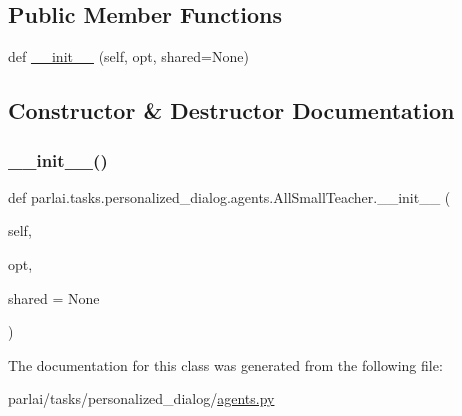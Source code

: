 \subsection*{Public Member Functions}
\begin{DoxyCompactItemize}
\item 
def \hyperlink{classparlai_1_1tasks_1_1personalized__dialog_1_1agents_1_1AllSmallTeacher_a1bb0f39431c43a72a244ae11cd3f1794}{\+\_\+\+\_\+init\+\_\+\+\_\+} (self, opt, shared=None)
\end{DoxyCompactItemize}


\subsection{Constructor \& Destructor Documentation}
\mbox{\label{classparlai_1_1tasks_1_1personalized__dialog_1_1agents_1_1AllSmallTeacher_a1bb0f39431c43a72a244ae11cd3f1794}} 
\subsubsection{\texorpdfstring{\+\_\+\+\_\+init\+\_\+\+\_\+()}{\_\_init\_\_()}}
{\footnotesize\ttfamily def parlai.\+tasks.\+personalized\+\_\+dialog.\+agents.\+All\+Small\+Teacher.\+\_\+\+\_\+init\+\_\+\+\_\+ (\begin{DoxyParamCaption}\item[{}]{self,  }\item[{}]{opt,  }\item[{}]{shared = {\ttfamily None} }\end{DoxyParamCaption})}



The documentation for this class was generated from the following file\+:\begin{DoxyCompactItemize}
\item 
parlai/tasks/personalized\+\_\+dialog/\hyperlink{parlai_2tasks_2personalized__dialog_2agents_8py}{agents.\+py}\end{DoxyCompactItemize}
